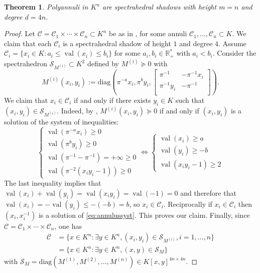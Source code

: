 \documentclass{elsarticle}
\theoremstyle{plain}
\newtheorem{theorem}{Theorem}[section]
\theoremstyle{definition}
\newcommand{\R}{\mathbb{R}} %
\DeclareMathOperator{\val}{val}
\def\diag{\mathrm{diag}}
\begin{document}
\begin{theorem}
Polyannuli in $K^n$ are spectrahedral shadows with height $m=n$ and degree $d=4n$.
\end{theorem}
\begin{proof}
  Let $\mathcal{C} = \mathcal{C}_1 \times \cdots \times \mathcal{C}_n \subset K^n$ be as in ,
  for some annuli $\mathcal{C}_1,\ldots,\mathcal{C}_n \subset K$. We claim that each $\mathcal{C}_i$ is a spectrahedral
  shadow of height $1$ and degree $4$. Assume $\mathcal{C}_i = \{x_i \in K : a_i \leq \val(x_i) \leq b_i\}$
  for some $a_i, b_i \in \R^*_+$ with $a_i < b_i$. Consider the spectrahedron
  $\mathcal{S}_{M^{(i)}} \subset K^2$ defined by $M^{(i)} \succeq 0$ with
  $$
  M^{(i)}(x_i,y_i) := \diag\left(\pi^{-a} x_i, \pi^{b} y_i,
  \begin{bmatrix}
    \pi^{-1} & -\pi^{-1} x_i  \\
    \pi^{-1} y_i & - \pi^{-1} \\
  \end{bmatrix}\right).
  $$
  We claim that $x_i \in \mathcal{C}_i$ if and only if there exists $y_i \in K$ such that $(x_i,y_i) \in
  \mathcal{S}_{M^{(i)}}$.
  Indeed, by , $M^{(i)}(x_i,y_i) \succeq 0$ if and only if $(x_i,y_i)$ is a solution of the system
  of inequalities:
  \begin{equation}
    \label{eq:annulussyst}
    \begin{cases}
      \val(\pi^{-a} x_i) \ge 0 \\
  \val(\pi^{b} y_i) \ge 0\\
  \val(\pi^{-1}- \pi^{-1}) = +\infty \ge 0\\
  \val(\pi^{-2}\left( x_iy_i-1 \right))  \ge 0 
\end{cases}
\iff	
\begin{cases} 
  \val\left(x_i\right)\ge a\\
  \val\left(y_i\right)\ge -b\\
  \val\left(x_iy_i-1 \right) \ge 2
\end{cases}
\end{equation} 
  The last inequality implies that $\val\left(x_i\right)+\val\left(y_i\right)=\val\left(x_iy_i\right) = \val\left(-1\right) =0$ and therefore that $\val\left(x_i\right)=-\val\left(y_i\right)\le -(-b) = b$, so $x_i \in \mathcal{C}_i$. 
Reciprocally if $x_i \in \mathcal{C}_i$ then $(x_i,x_i^{-1})$ is a solution of \eqref{eq:annulussyst}.
This proves our claim.
Finally, since $\mathcal{C} = \mathcal{C}_1 \times \cdots \times \mathcal{C}_n$, one has
\begin{equation*}
  \begin{aligned}
    \mathcal{C} &=
    \{x \in K^n : \exists y  \in K^n, (x_i,y_i) \in
    \mathcal{S}_{M^{(i)}}, i=1,\ldots,n\} \\
    &= \{x \in K^n : \exists y \in K^n, (x,y) \in \mathcal{S}_M\}
  \end{aligned}
\end{equation*}
with $\mathcal{S}_M = \diag(M^{(1)}, M^{(2)}, \ldots, M^{(n)}) \in K[x,y]^{4n \times 4n}.$
\end{proof}
\end{document}
